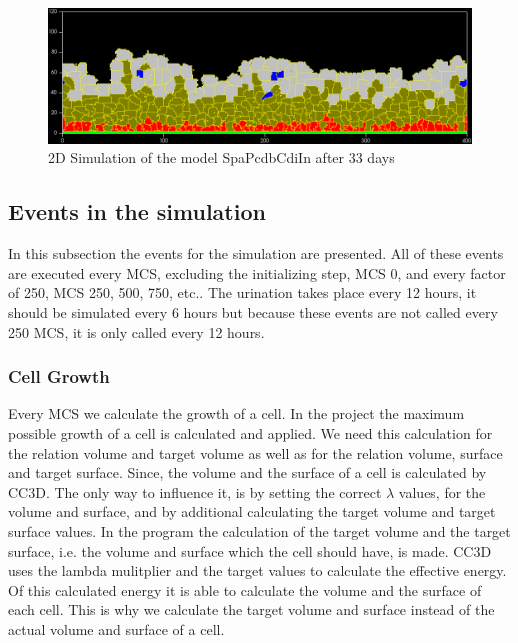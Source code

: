 \begin{figure}
	\center
	\includegraphics[scale=0.35]{figures/2DSimulation-33Days.png}
	\caption{2D Simulation of the model SpaPcdbCdiIn after 33 days}
	\label{img:2DSimulation33Days}
\end{figure}

\subsection{Events in the simulation}
In this subsection the events for the simulation are presented. All of these events are executed every \ac{MCS}, excluding the initializing step, \ac{MCS} 0, and every factor of 250, \ac{MCS} 250, 500, 750, etc.. \newline
The urination takes place every 12 hours, it should be simulated every 6 hours but because these events are not called every 250 \ac{MCS}, it is only called every 12 hours.

\subsubsection{Cell Growth}
Every \ac{MCS} we calculate the growth of a cell. In the project the maximum possible growth of a cell is calculated and applied.  We need this calculation for the relation volume and target volume as well as for the relation volume, surface and target surface. Since, the volume and the surface of a cell is calculated by \ac{CC3D}. The only way to influence it, is by setting the correct $\lambda$ values, for the volume and surface, and by additional calculating the target volume and target surface values. In the program the calculation of the target volume and the target surface, i.e. the volume and surface which the cell should have, is made. \ac{CC3D} uses the lambda mulitplier and the target values to calculate the effective energy. Of this calculated energy it is able to calculate the volume and the surface of each cell. This is why we calculate the target volume and surface instead of the actual volume and surface of a cell.

